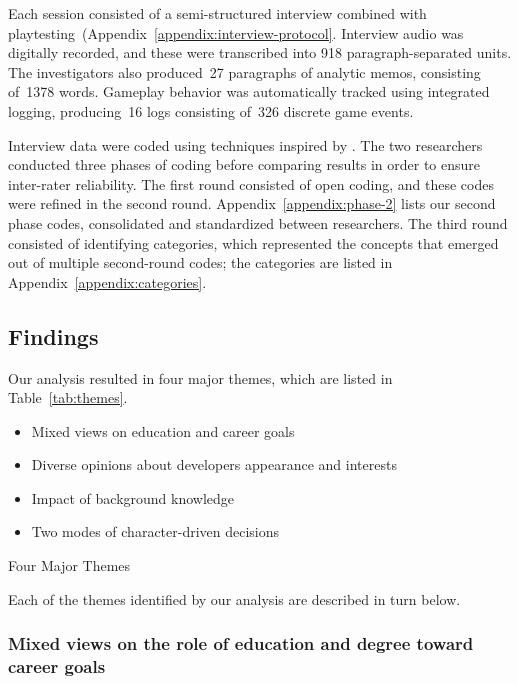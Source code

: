 \documentclass[letterpaper]{article}
\begin{document}
Each session consisted of a semi-structured interview combined with
playtesting~(Appendix~\ref{appendix:interview-protocol}.
Interview audio was digitally recorded, and these were transcribed
into 918 paragraph-separated units. 
The investigators also 
produced~27 paragraphs of analytic memos,
consisting of~1378 words.
Gameplay behavior was automatically tracked using integrated logging, 
producing~16 logs consisting of~326 discrete game events.

Interview data were coded using techniques inspired by
\citet{Saldana2009}. The two researchers conducted three phases 
of coding before comparing results in order to ensure inter-rater
reliability. The first round consisted of open coding, and these
codes were refined in the second round. 
Appendix~\ref{appendix:phase-2} lists our second phase codes,
consolidated and standardized between researchers.
The third round consisted of
identifying categories, which represented the concepts that emerged
out of multiple second-round codes; the categories are listed in
Appendix~\ref{appendix:categories}.

\subsection{Findings}

Our analysis resulted in four major themes, which are listed
in Table~\ref{tab:themes}.
%
\begin{table}
\begin{framed}
\begin{itemize}
\item Mixed views on education and career goals
\item Diverse opinions about developers appearance and interests
\item Impact of background knowledge
\item Two modes of character-driven decisions
\end{itemize}
\caption{Four Major Themes}
\label{tab:themes}
\end{framed}
\end{table}
%
Each of the themes identified by our analysis are described in turn below.


\newcommand{\theme}[1]{\subsubsection*{#1}}

\theme{Mixed views on the role of education and degree toward career goals}
\end{document}

